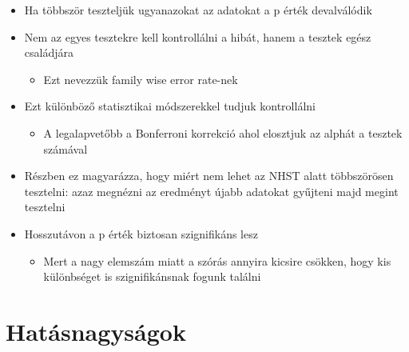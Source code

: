 \documentclass[
  letterpaper,
  DIV=11,
  numbers=noendperiod]{scrreprt}
\providecommand{\tightlist}{%
  \setlength{\itemsep}{0pt}\setlength{\parskip}{0pt}}\usepackage{longtable,booktabs,array}
\begin{document}
\begin{itemize}
\item
  Ha többször teszteljük ugyanazokat az adatokat a p érték devalválódik
\item
  Nem az egyes tesztekre kell kontrollálni a hibát, hanem a tesztek
  egész családjára

  \begin{itemize}
  \tightlist
  \item
    Ezt nevezzük family wise error rate-nek
  \end{itemize}
\item
  Ezt különböző statisztikai módszerekkel tudjuk kontrollálni

  \begin{itemize}
  \tightlist
  \item
    A legalapvetőbb a Bonferroni korrekció ahol elosztjuk az alphát a
    tesztek számával
  \end{itemize}
\item
  Részben ez magyarázza, hogy miért nem lehet az NHST alatt többszörösen
  tesztelni: azaz megnézni az eredményt újabb adatokat gyűjteni majd
  megint tesztelni
\item
  Hosszutávon a p érték biztosan szignifikáns lesz

  \begin{itemize}
  \tightlist
  \item
    Mert a nagy elemszám miatt a szórás annyira kicsire csökken, hogy
    kis különbséget is szignifikánsnak fogunk találni
  \end{itemize}
\end{itemize}

\hypertarget{hatuxe1snagysuxe1gok}{%
\section{Hatásnagyságok}\label{hatuxe1snagysuxe1gok}}
\end{document}
